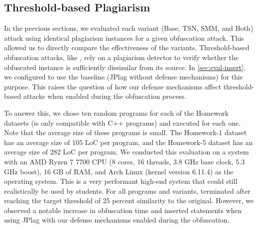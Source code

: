\subsection{Threshold-based Plagiarism}\label{sec:eval-mossad}

In the previous sections, we evaluated each variant (Base, TSN, SMM, and Both) attack using identical plagiarism instances for a given obfuscation attack.
This allowed us to directly compare the effectiveness of the variants.
Threshold-based obfuscation attacks, like \mossad, rely on a plagiarism detector to verify whether the obfuscated instance is sufficiently dissimilar from its source.
In \autoref{sec:eval-insert}, we configured \mossad to use the baseline (JPlag without defense mechanisms) for this purpose.
This raises the question of how our defense mechanisms affect threshold-based attacks when enabled during the obfuscation process.

To answer this, we chose ten random programs for each of the Homework datasets (\mossad is only compatible with C++ programs) and executed \mossad for each one.
Note that the average size of these programs is small. The Homework-1 dataset has an average size of 105 LoC per program, and the Homework-5 dataset has an average size of 282 LoC per program.
We conducted this evaluation on a system with an AMD Ryzen 7 7700 CPU (8 cores, 16 threads, 3.8 GHz base clock, 5.3 GHz boost), 16 GB of RAM, and Arch Linux (kernel version 6.11.4) as the operating system.
This is a very performant high-end system that could still realistically be used by students.
%
For all programs and variants, \mossad terminated after reaching the target threshold of 25 percent similarity to the original.
However, we observed a notable increase in obfuscation time and inserted statements when using JPlag with our defense mechanisms enabled during the obfuscation.

